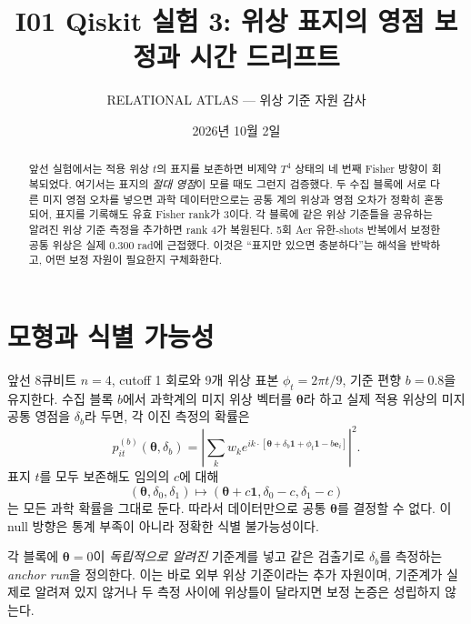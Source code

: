 \documentclass[11pt,a4paper]{article}
\title{I01 Qiskit 실험 3: 위상 표지의 영점 보정과 시간 드리프트}
\author{RELATIONAL ATLAS --- 위상 기준 자원 감사}
\date{2026년 10월 2일}
\begin{document}
\maketitle

\begin{abstract}
앞선 실험에서는 적용 위상 $t$의 표지를 보존하면 비제약 $T^4$
상태의 네 번째 Fisher 방향이 회복되었다. 여기서는 표지의
\emph{절대 영점}이 모를 때도 그런지 검증했다. 두 수집 블록에
서로 다른 미지 영점 오차를 넣으면 과학 데이터만으로는 공통
계의 위상과 영점 오차가 정확히 혼동되어, 표지를 기록해도
유효 Fisher rank가 3이다. 각 블록에 같은 위상 기준틀을 공유하는
알려진 위상 기준 측정을 추가하면 rank 4가 복원된다. 5회
Aer 유한-shots 반복에서 보정한 공통 위상은 실제 $0.300$ rad에
근접했다. 이것은 ``표지만 있으면 충분하다''는 해석을 반박하고,
어떤 보정 자원이 필요한지 구체화한다.
\end{abstract}

\section{모형과 식별 가능성}
앞선 8큐비트 $n=4$, cutoff 1 회로와 9개 위상 표본
$\phi_t=2\pi t/9$, 기준 편향 $b=0.8$을 유지한다.
수집 블록 $b$에서 과학계의 미지 위상 벡터를
$\boldsymbol\theta$라 하고 실제 적용 위상의 미지 공통 영점을
$\delta_b$라 두면, 각 이진 측정의 확률은
\begin{equation}
 p_{it}^{(b)}(\boldsymbol\theta,\delta_b)=
 \left|\sum_k w_k
 e^{ik\cdot[\boldsymbol\theta+\delta_b\boldsymbol1+
 \phi_t\boldsymbol1-b\boldsymbol e_i]}\right|^2.
\end{equation}
표지 $t$를 모두 보존해도 임의의 $c$에 대해
\begin{equation}
 (\boldsymbol\theta,\delta_0,\delta_1)
 \longmapsto
 (\boldsymbol\theta+c\boldsymbol1,\delta_0-c,\delta_1-c)
\end{equation}
는 모든 과학 확률을 그대로 둔다. 따라서 데이터만으로
공통 $\boldsymbol\theta$를 결정할 수 없다. 이 null 방향은
통계 부족이 아니라 정확한 식별 불가능성이다.

각 블록에 $\boldsymbol\theta=0$이 \emph{독립적으로 알려진}
기준계를 넣고 같은 검출기로 $\delta_b$를 측정하는
\emph{anchor run}을 정의한다. 이는 바로 외부 위상 기준이라는
추가 자원이며, 기준계가 실제로 알려져 있지 않거나 두 측정
사이에 위상틀이 달라지면 보정 논증은 성립하지 않는다.
\end{document}
